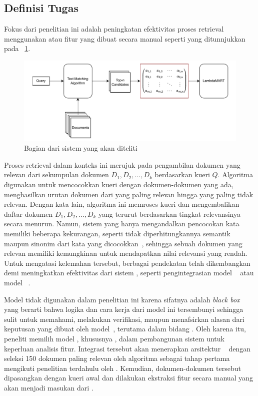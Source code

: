 \subsection{Definisi Tugas}
\label{subbab:3:Definisi Tugas}
Fokus dari penelitian ini adalah peningkatan efektivitas proses retrieval menggunakan \hcf{} atau fitur yang dibuat secara manual seperti yang ditunnjukkan pada \gambar{}~\ref{fig:posisiPenelitian}.
\begin{figure}[!ht]
    \centering
    \includegraphics[scale=0.75]{assets/pdfs/PosisiPenelitian.pdf}
    \caption{Bagian dari sistem \ir{} yang akan diteliti}
    \label{fig:posisiPenelitian}
\end{figure}
Proses retrieval dalam konteks ini merujuk pada pengambilan dokumen yang relevan dari sekumpulan dokumen \(D_1,D_2,...,D_k\) berdasarkan kueri \(Q\). Algoritma \txt{} \matching{} digunakan untuk mencocokkan kueri dengan dokumen-dokumen yang ada, menghasilkan urutan dokumen dari yang paling relevan hingga yang paling tidak relevan. Dengan kata lain, algoritma ini memroses kueri dan mengembalikan daftar dokumen \(D_1,D_2,...,D_k\) yang terurut berdasarkan tingkat relevansinya secara menurun. Namun, sistem \ir{} yang hanya mengandalkan pencocokan kata memiliki beberapa kekurangan, seperti tidak diperhitungkannya semantik maupun sinonim dari kata yang dicocokkan~\citep{hambarde2023information}, sehingga sebuah dokumen yang relevan memiliki kemungkinan untuk mendapatkan nilai relevansi yang rendah. Untuk mengatasi kelemahan tersebut, berbagai pendekatan telah dikembangkan demi meningkatkan efektivitas dari sistem \ir{}, seperti pengintegrasian model \ml{}~\citep{burges2010ranknet} atau model \nn{}~\citep{1223700}.

Model \nn{} tidak digunakan dalam penelitian ini karena sifatnya adalah \textit{black box} yang berarti bahwa logika dan cara kerja dari model ini tersembunyi sehingga sulit untuk memahami, melakukan verifikasi, maupun menafsirkan alasan dari keputusan yang dibuat oleh model~\citep{electronics8080832}, terutama dalam bidang \ir{}. Oleh karena itu, peneliti memilih model \ml{}, khususnya \lambdamart{}, dalam pembangunan sistem \ir{} untuk keperluan analisis fitur. Integrasi tersebut akan menerapkan arsitektur \cascaded{}~\citep{wang2011cascade} dengan seleksi 150 dokumen paling relevan oleh algoritma \txt{} \matching{} sebagai tahap pertama mengikuti penelitian terdahulu oleh \citet{nguyen2024captain}. Kemudian, dokumen-dokumen tersebut dipasangkan dengan kueri awal dan dilakukan ekstraksi fitur secara manual yang akan menjadi masukan dari \lambdamart{}. 
